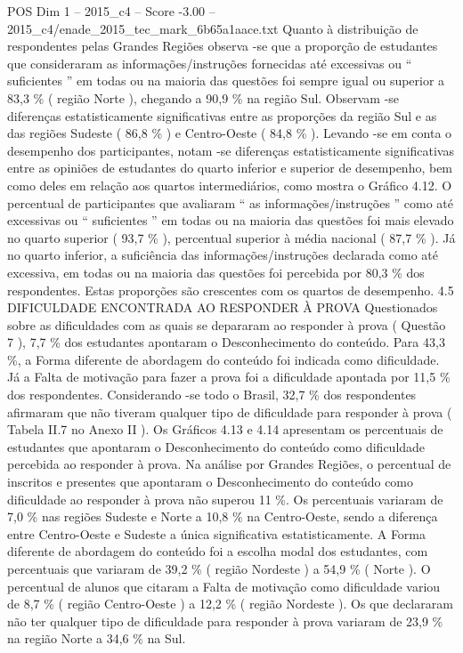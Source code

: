 \begin{textsample}{POS Dim 1 – 2015\_c4 – Score -3.00 – 2015\_c4/enade\_2015\_tec\_mark\_6b65a1aace.txt}
Quanto à distribuição de respondentes pelas Grandes Regiões observa -se que a proporção de estudantes que consideraram as informações/instruções fornecidas até excessivas ou “ suficientes ” em todas ou na maioria das questões foi sempre igual ou superior a 83,3 \% ( região Norte ), chegando a 90,9 \% na região Sul.
Observam -se diferenças estatisticamente significativas entre as proporções da região Sul e as das regiões Sudeste ( 86,8 \% ) e Centro-Oeste ( 84,8 \% ).
Levando -se em conta o desempenho dos participantes, notam -se diferenças estatisticamente significativas entre as opiniões de estudantes do quarto inferior e superior de desempenho, bem como deles em relação aos quartos intermediários, como mostra o Gráfico 4.12.
O percentual de participantes que avaliaram “ as informações/instruções ” como até excessivas ou “ suficientes ” em todas ou na maioria das questões foi mais elevado no quarto superior ( 93,7 \% ), percentual superior à média nacional ( 87,7 \% ).
Já no quarto inferior, a suficiência das informações/instruções declarada como até excessiva, em todas ou na maioria das questões foi percebida por 80,3 \% dos respondentes.
Estas proporções são crescentes com os quartos de desempenho. 4.5 DIFICULDADE ENCONTRADA AO RESPONDER À PROVA Questionados sobre as dificuldades com as quais se depararam ao responder à prova ( Questão 7 ), 7,7 \% dos estudantes apontaram o Desconhecimento do conteúdo.
Para 43,3 \%, a Forma diferente de abordagem do conteúdo foi indicada como dificuldade.
Já a Falta de motivação para fazer a prova foi a dificuldade apontada por 11,5 \% dos respondentes.
Considerando -se todo o Brasil, 32,7 \% dos respondentes afirmaram que não tiveram qualquer tipo de dificuldade para responder à prova ( Tabela II.7 no Anexo II ).
Os Gráficos 4.13 e 4.14 apresentam os percentuais de estudantes que apontaram o Desconhecimento do conteúdo como dificuldade percebida ao responder à prova.
Na análise por Grandes Regiões, o percentual de inscritos e presentes que apontaram o Desconhecimento do conteúdo como dificuldade ao responder à prova não superou 11 \%.
Os percentuais variaram de 7,0 \% nas regiões Sudeste e Norte a 10,8 \% na Centro-Oeste, sendo a diferença entre Centro-Oeste e Sudeste a única significativa estatisticamente.
A Forma diferente de abordagem do conteúdo foi a escolha modal dos estudantes, com percentuais que variaram de 39,2 \% ( região Nordeste ) a 54,9 \% ( Norte ).
O percentual de alunos que citaram a Falta de motivação como dificuldade variou de 8,7 \% ( região Centro-Oeste ) a 12,2 \% ( região Nordeste ).
Os que declararam não ter qualquer tipo de dificuldade para responder à prova variaram de 23,9 \% na região Norte a 34,6 \% na Sul.

\end{textsample}
